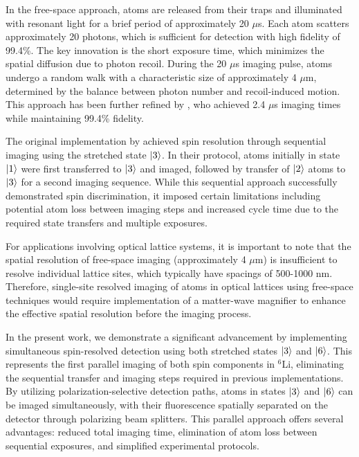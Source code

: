 In the free-space approach, atoms are released from their traps and illuminated with resonant light for a brief period of approximately 20 $\mu$s. Each atom scatters approximately 20 photons, which is sufficient for detection with high fidelity of 99.4\%. The key innovation is the short exposure time, which minimizes the spatial diffusion due to photon recoil. During the 20 $\mu$s imaging pulse, atoms undergo a random walk with a characteristic size of approximately 4 $\mu$m, determined by the balance between photon number and recoil-induced motion. This approach has been further refined by \cite{su_fast_2025}, who achieved 2.4 $\mu$s imaging times while maintaining 99.4\% fidelity.

The original implementation by \cite{bergschneider_spin-resolved_2018} achieved spin resolution through sequential imaging using the stretched state $\left| 3 \right\rangle$. In their protocol, atoms initially in state $\left| 1 \right\rangle$ were first transferred to $\left| 3 \right\rangle$ and imaged, followed by transfer of $\left| 2 \right\rangle$ atoms to $\left| 3 \right\rangle$ for a second imaging sequence. While this sequential approach successfully demonstrated spin discrimination, it imposed certain limitations including potential atom loss between imaging steps and increased cycle time due to the required state transfers and multiple exposures.

For applications involving optical lattice systems, it is important to note that the spatial resolution of free-space imaging (approximately 4 $\mu$m) is insufficient to resolve individual lattice sites, which typically have spacings of 500-1000 nm. Therefore, single-site resolved imaging of atoms in optical lattices using free-space techniques would require implementation of a matter-wave magnifier to enhance the effective spatial resolution before the imaging process.

In the present work, we demonstrate a significant advancement by implementing simultaneous spin-resolved detection using both stretched states $\left| 3 \right\rangle$ and $\left| 6 \right\rangle$. This represents the first parallel imaging of both spin components in $^6$Li, eliminating the sequential transfer and imaging steps required in previous implementations. By utilizing polarization-selective detection paths, atoms in states $\left| 3 \right\rangle$ and $\left| 6 \right\rangle$ can be imaged simultaneously, with their fluorescence spatially separated on the detector through polarizing beam splitters. This parallel approach offers several advantages: reduced total imaging time, elimination of atom loss between sequential exposures, and simplified experimental protocols.

